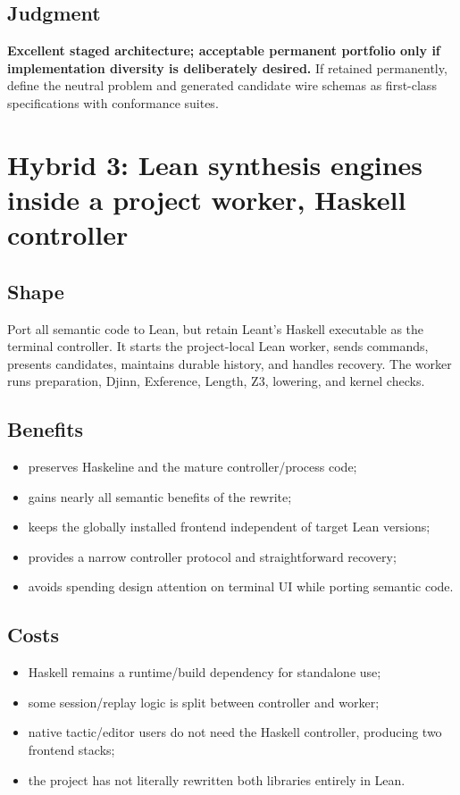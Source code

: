 \documentclass[10pt,letterpaper,oneside]{report}
\begin{document}
\subsection{Judgment}

\textbf{Excellent staged architecture; acceptable permanent portfolio only if implementation diversity is deliberately desired.} If retained permanently, define the neutral problem and generated candidate wire schemas as first-class specifications with conformance suites.

\section{Hybrid 3: Lean synthesis engines inside a project worker, Haskell controller}

\subsection{Shape}

Port all semantic code to Lean, but retain Leant's Haskell executable as the terminal controller. It starts the project-local Lean worker, sends commands, presents candidates, maintains durable history, and handles recovery. The worker runs preparation, Djinn, Exference, Length, Z3, lowering, and kernel checks.

\subsection{Benefits}

\begin{itemize}
  \item preserves Haskeline and the mature controller/process code;
  \item gains nearly all semantic benefits of the rewrite;
  \item keeps the globally installed frontend independent of target Lean versions;
  \item provides a narrow controller protocol and straightforward recovery;
  \item avoids spending design attention on terminal UI while porting semantic code.
\end{itemize}

\subsection{Costs}

\begin{itemize}
  \item Haskell remains a runtime/build dependency for standalone use;
  \item some session/replay logic is split between controller and worker;
  \item native tactic/editor users do not need the Haskell controller, producing two frontend stacks;
  \item the project has not literally rewritten both libraries entirely in Lean.
\end{itemize}
\end{document}
